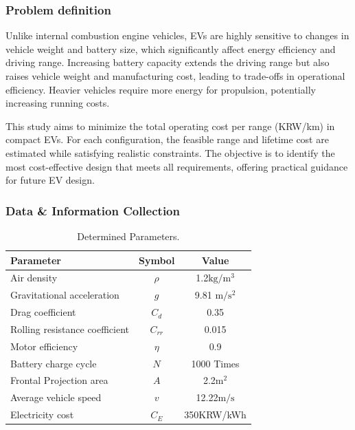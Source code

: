 \documentclass[11pt,twocolumn]{article}
\begin{document}
            \subsubsection{Problem definition}
                Unlike internal combustion engine vehicles, EVs are highly sensitive to changes in vehicle weight and battery size, which significantly affect energy efficiency and driving range. Increasing battery capacity extends the driving range but also raises vehicle weight and manufacturing cost, leading to trade-offs in operational efficiency. Heavier vehicles require more energy for propulsion, potentially increasing running costs.
                \par
                This study aims to minimize the total operating cost per range (KRW/km) in compact EVs. For each configuration, the feasible range and lifetime cost are estimated while satisfying realistic constraints. The objective is to identify the most cost-effective design that meets all requirements, offering practical guidance for future EV design.

            \subsubsection{Data \& Information Collection}
                \begin{table}
                    \vspace{-15mm}
                    \centering
                    \caption{Determined Parameters.}
                    \label{params}
                    \begin{tabular}{lcc}
                        \toprule
                        Parameter & Symbol & Value\\
                        \midrule
                        Air density & $\rho$ & 1.2$\mathrm{kg/m^3}$ \\
                        Gravitational acceleration & $g$ & 9.81  $\mathrm{m/s^2}$ \\
                        Drag coefficient & $C_d$ & 0.35 \\
                        Rolling resistance coefficient & $C_{rr}$ & 0.015 \\
                        Motor efficiency & $η$ & 0.9 \\
                        Battery charge cycle & $N$ & 1000 Times \\
                        Frontal Projection area & $A$ & 2.2$\mathrm{m^2}$ \\
                        Average vehicle speed & $v$ & 12.22$\mathrm{m/s}$ \\
                        Electricity cost & $C_E$ & 350KRW/kWh \\
                        \bottomrule
                    \end{tabular}
                \end{table}
\end{document}
